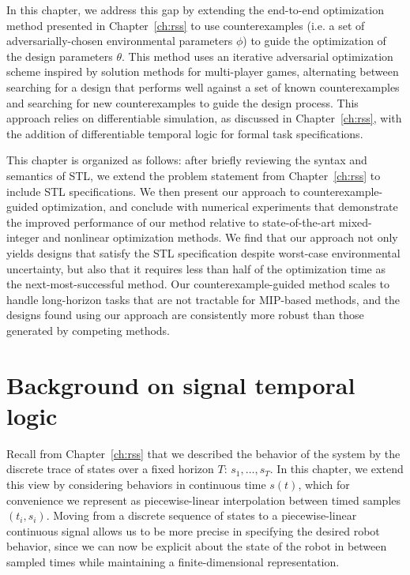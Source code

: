 In this chapter, we address this gap by extending the end-to-end optimization method presented in Chapter~\ref{ch:rss} to use counterexamples (i.e. a set of adversarially-chosen environmental parameters $\phi$) to guide the optimization of the design parameters $\theta$. This method uses an iterative adversarial optimization scheme inspired by solution methods for multi-player games, alternating between searching for a design that performs well against a set of known counterexamples and searching for new counterexamples to guide the design process. This approach relies on differentiable simulation, as discussed in Chapter~\ref{ch:rss}, with the addition of differentiable temporal logic for formal task specifications. 

This chapter is organized as follows: after briefly reviewing the syntax and semantics of STL, we extend the problem statement from Chapter~\ref{ch:rss} to include STL specifications. We then present our approach to counterexample-guided optimization, and conclude with numerical experiments that demonstrate the improved performance of our method relative to state-of-the-art mixed-integer and nonlinear optimization methods. We find that our approach not only yields designs that satisfy the STL specification despite worst-case environmental uncertainty, but also that it requires less than half of the optimization time as the next-most-successful method. Our counterexample-guided method scales to handle long-horizon tasks that are not tractable for MIP-based methods, and the designs found using our approach are consistently more robust than those generated by competing methods.

\section{Background on signal temporal logic}

Recall from Chapter~\ref{ch:rss} that we described the behavior of the system by the discrete trace of states over a fixed horizon $T$: $s_1, \ldots, s_T$. In this chapter, we extend this view by considering behaviors in continuous time $s(t)$, which for convenience we represent as piecewise-linear interpolation between timed samples $(t_i, s_i)$. Moving from a discrete sequence of states to a piecewise-linear continuous signal allows us to be more precise in specifying the desired robot behavior, since we can now be explicit about the state of the robot in between sampled times while maintaining a finite-dimensional representation.

